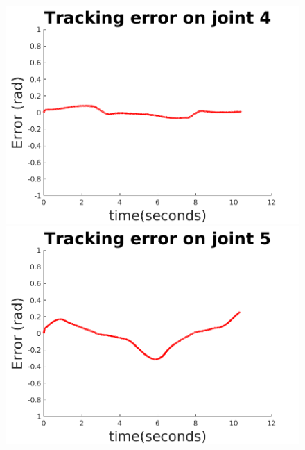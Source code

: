 \documentclass{beamer}
\begin{document}
\begin{frame}
\begin{figure}
\begin{minipage}{.45\textwidth}
  \centering
  \includegraphics[trim=0 0 0 0,width=0.9\linewidth]{images/joint4_trajectoryerror}
\end{minipage}
\begin{minipage}{.45\textwidth}
  \centering
  \includegraphics[trim=0 0 0 0,width=0.9\linewidth]{images/joint5_trajectoryerror}
\end{minipage}
\end{figure}	

\end{frame}
\end{document}
